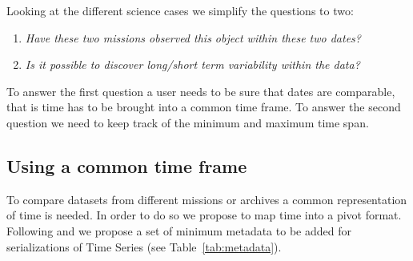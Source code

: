\documentclass[11pt,a4paper]{ivoa}
\begin{document}
%

Looking at the different science cases we simplify the questions to two:
\begin{enumerate}
\item \emph{Have these two missions observed this object within these two dates?}
\item \emph{Is it possible to discover long/short term variability within the data?}

\end{enumerate}
To answer the first question a user needs to be sure that dates are comparable, that is time has to be brought into a common time frame.
To answer the second question we need to keep track of the minimum and maximum time span.

\subsection{Using a common time frame}
\label{sec:comtimeframe}
To compare datasets from different missions or archives a common representation of time is needed. In order to do so we propose to map time into a pivot format. Following \cite{2015A+A...574A..36R} and \cite{2007ivoa.spec.1030R} we propose a set of minimum metadata to be added for serializations of Time Series (see Table~\ref{tab:metadata}).
\end{document}

